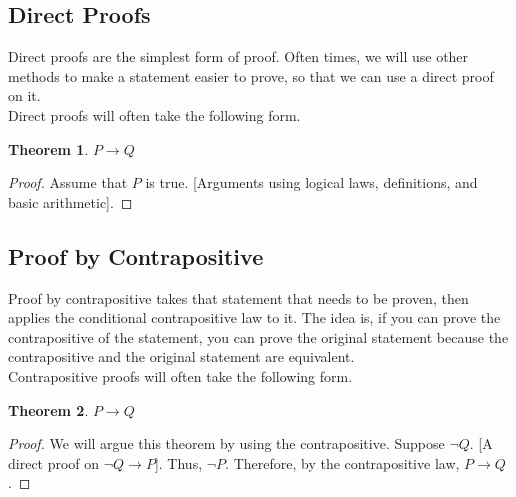 \documentclass{article}
\newtheorem{theorem}{Theorem}[section]
\begin{document}
\subsection{Direct Proofs}
Direct proofs are the simplest form of proof. Often times, we will use other methods to 
make a statement easier to prove, so that we can use a direct proof on it. \\

\noindent Direct proofs will often take the following form.
\begin{theorem}
    $P \rightarrow Q$
\end{theorem}
\begin{proof}
    Assume that $P$ is true. [Arguments using logical laws, definitions, and basic arithmetic].
\end{proof}

\subsection{Proof by Contrapositive}
Proof by contrapositive takes that statement that needs to be proven, then applies the
conditional contrapositive law to it. The idea is, if you can prove the contrapositive
of the statement, you can prove the original statement because the contrapositive and the
original statement are equivalent. \\

\noindent Contrapositive proofs will often take the following form.
\begin{theorem}
    $P \rightarrow Q$
\end{theorem}
\begin{proof}
    We will argue this theorem by using the contrapositive. Suppose $\neg Q$. [A direct proof on
    $\neg Q \rightarrow P$]. Thus, $\neg P$. Therefore, by the contrapositive law, $P \rightarrow Q$. 
\end{proof}
\end{document}
